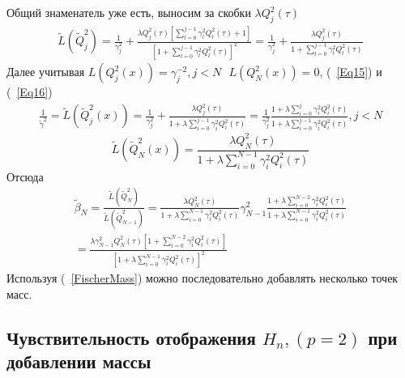 Общий знаменатель уже есть, выносим за скобки $\lambda Q_j^2(\tau)$
\begin{eqnarray}
\tilde{L}(\tilde{Q}_j^2)=\frac{1}{\gamma_j^2}+
\frac{\lambda Q_j^2(\tau) \left[
\sum\limits_{l=0}^{j-1}{\gamma_l^2Q_l^2(\tau)+1}
\right]}
{\left[
1+\sum\limits_{l=0}^{j-1}{\gamma_l^2Q_l^2(\tau)}
\right]^2}=
\frac{1}{\gamma_j^2}+
\frac{\lambda Q_j^2(\tau)}
{1+\sum\limits_{l=0}^{j-1}{\gamma_l^2Q_l^2(\tau)}}
\end{eqnarray}
Далее учитывая $L(Q_j^2(x))=\gamma_j^{-2},j<N\mbox{     }L(Q_N^2(x))=0$, (~\ref{Eq15}) и (~\ref{Eq16})
\begin{eqnarray}
\frac{1}{\tilde{\gamma}^2}=\tilde{L}(\tilde{Q}_j^2(x))=\frac{1}{\gamma_j^2}+
\frac{\lambda Q_j^2(\tau)} {1+\lambda\sum\limits_{i=0}^{j-1}{\gamma_i^2 Q_i^2(\tau)}}
=\frac{1}{\gamma_j^2}\frac{1+\lambda \sum\limits_{i=0}^{j}{\gamma_i^2 Q_i^2(\tau)}}
{1+\lambda \sum\limits_{i=0}^{j-1}{\gamma_i^2 Q_i^2(\tau)}},j<N \nonumber
\end{eqnarray}
\begin{equation}
\tilde{L}(\tilde{Q}_N^2(x))=\frac{\lambda Q_N^2(\tau)}
{1+\lambda \sum\limits_{i=0}^{N-1}{\gamma_i^2 Q_i^2(\tau)}}
\end{equation}
Отсюда
\begin{eqnarray}
\tilde{\beta}_N=
\frac{\tilde{L}(\tilde{Q}_{N}^2)}
{\tilde{L}(\tilde{Q}_{N-1}^2)}=
\frac {\lambda Q_N^2(\tau)}
{1+\lambda \sum\limits_{i=0}^{N-1}{\gamma_i^2 Q_i^2(\tau)}}
\gamma_{N-1}^2
\frac {1+\lambda \sum\limits_{i=0}^{N-2}{\gamma_i^2 Q_i^2(\tau)}}
{1+\lambda \sum\limits_{i=0}^{N-1}{\gamma_i^2 Q_i^2(\tau)}} \nonumber \\
=\frac
{\lambda \gamma_{N-1}^2 Q_{N}^2( \tau)\left[1+\sum\limits_{i=0}^{N-2}{\gamma_i^2 Q_i^2(\tau)}\right]}
{\left[1+\lambda \sum\limits_{i=0}^{N-1}{\gamma_i^2 Q_i^2(\tau)}\right]^2} \nonumber
\end{eqnarray}
Используя (~\ref{FischerMass}) можно последовательно добавлять
несколько точек масс.

\subsection{Чувствительность отображения $H_n, (p=2)$ при добавлении массы}

